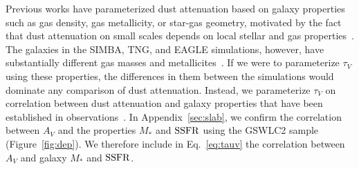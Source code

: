 Previous works have parameterized dust attenuation based on galaxy properties
such as gas density, gas metallicity, or star-gas geometry, motivated by
the fact that dust attenuation on small scales depends on local stellar and gas
properties~\citep[\eg][]{somerville1999, somerville2012, steinacker2013,
camps2015, narayanan2018, trayford2020, vogelsberger2020}. 
The galaxies in the SIMBA, TNG, and EAGLE simulations, however, have
substantially different gas masses and metallicites~\citep[][Maller \etal~in prep.]{dave2020}.  
If we were to parameterize $\tau_V$ using these properties, the differences
in them between the simulations would dominate any comparison of dust attenuation.
Instead, we parameterize $\tau_V$ on correlation between dust attenuation
and galaxy properties that have been established in observations~\citep[\eg~][]{garn2010, battisti2016, salim2020}.
In Appendix~\ref{sec:slab}, we confirm the correlation between $A_V$ and
the properties $M_*$ and ${\rm SSFR}$ using the \cite{salim2018} GSWLC2 sample
(Figure~\ref{fig:dep}). 
We therefore include in Eq.~\ref{eq:tauv} the correlation between $A_V$ and
galaxy $M_*$ and ${\rm SSFR}$.



